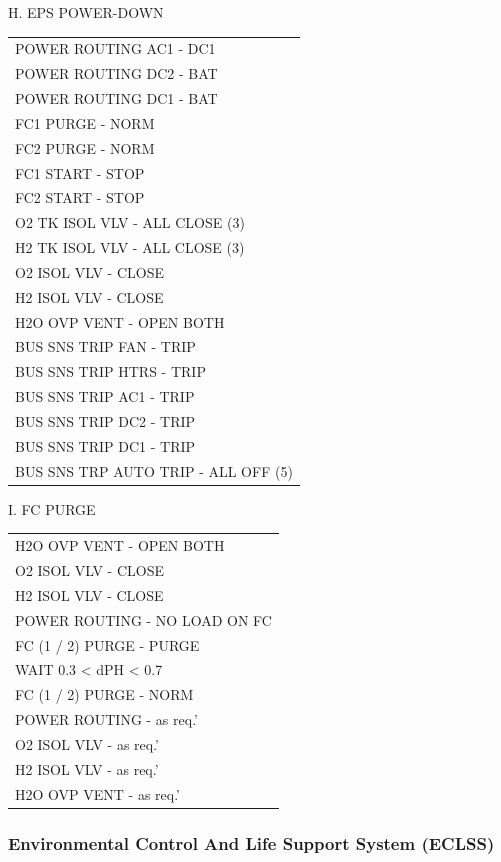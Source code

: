 \documentclass[Orbiter User Manual.tex]{subfiles}
\begin{document}
H. EPS POWER-DOWN
	\begin{longtable}{ p{\textwidth} }
	POWER ROUTING AC1 - DC1\\
	POWER ROUTING DC2 - BAT\\
	POWER ROUTING DC1 - BAT\\
	FC1 PURGE - NORM\\
	FC2 PURGE - NORM\\
	FC1 START - STOP\\
	FC2 START - STOP\\
	O2 TK ISOL VLV - ALL CLOSE (3)\\
	H2 TK ISOL VLV - ALL CLOSE (3)\\
	O2 ISOL VLV - CLOSE\\
	H2 ISOL VLV - CLOSE\\
	H2O OVP VENT - OPEN BOTH\\
	BUS SNS TRIP FAN - TRIP\\
	BUS SNS TRIP HTRS - TRIP\\
	BUS SNS TRIP AC1 - TRIP\\
	BUS SNS TRIP DC2 - TRIP\\
	BUS SNS TRIP DC1 - TRIP\\
	BUS SNS TRP AUTO TRIP - ALL OFF (5)
	\end{longtable}

I. FC PURGE
	\begin{longtable}{ p{\textwidth} }
	H2O OVP VENT - OPEN BOTH\\
	O2 ISOL VLV - CLOSE\\
	H2 ISOL VLV - CLOSE\\
	POWER ROUTING - NO LOAD ON FC\\
	FC (1 / 2) PURGE - PURGE\\
	WAIT 0.3 < dPH < 0.7\\
	FC (1 / 2) PURGE - NORM\\
	POWER ROUTING - as req.'\\
	O2 ISOL VLV - as req.'\\
	H2 ISOL VLV - as req.'\\
	H2O OVP VENT - as req.'
	\end{longtable}


\subsubsection{Environmental Control And Life Support System (ECLSS)}
\end{document}
